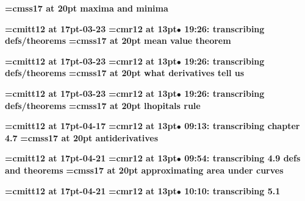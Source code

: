 {\medskip\noindent\bf\font\titlefont=cmss17 at 20pt maxima and minima}\medskip

{\medskip\noindent\bf\font\titlefont=cmitt12 at 17pt-03-23}\medskip
{\smallskip\noindent\bf\font\titlefont=cmr12 at 13pt\titlefont $\bullet$ 19:26: transcribing defs/theorems}\smallskip
{}
{\medskip\noindent\bf\font\titlefont=cmss17 at 20pt mean value theorem}\medskip

{\medskip\noindent\bf\font\titlefont=cmitt12 at 17pt-03-23}\medskip
{\smallskip\noindent\bf\font\titlefont=cmr12 at 13pt\titlefont $\bullet$ 19:26: transcribing defs/theorems}\smallskip
{}
{\medskip\noindent\bf\font\titlefont=cmss17 at 20pt what derivatives tell us}\medskip

{\medskip\noindent\bf\font\titlefont=cmitt12 at 17pt-03-23}\medskip
{\smallskip\noindent\bf\font\titlefont=cmr12 at 13pt\titlefont $\bullet$ 19:26: transcribing defs/theorems}\smallskip
{}
{\medskip\noindent\bf\font\titlefont=cmss17 at 20pt lhopitals rule}\medskip

{\medskip\noindent\bf\font\titlefont=cmitt12 at 17pt-04-17}\medskip
{\smallskip\noindent\bf\font\titlefont=cmr12 at 13pt\titlefont $\bullet$ 09:13: transcribing chapter 4.7}\smallskip
{}
{\medskip\noindent\bf\font\titlefont=cmss17 at 20pt antiderivatives}\medskip

{\medskip\noindent\bf\font\titlefont=cmitt12 at 17pt-04-21}\medskip
{\smallskip\noindent\bf\font\titlefont=cmr12 at 13pt\titlefont $\bullet$ 09:54: transcribing 4.9 defs and theorems}\smallskip
{}
{\medskip\noindent\bf\font\titlefont=cmss17 at 20pt approximating area under curves}\medskip

{\medskip\noindent\bf\font\titlefont=cmitt12 at 17pt-04-21}\medskip
{\smallskip\noindent\bf\font\titlefont=cmr12 at 13pt\titlefont $\bullet$ 10:10: transcribing 5.1}\smallskip
\bye
